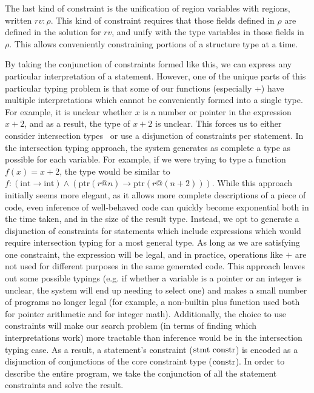 The last kind of constraint is the unification of region variables with regions, written $rv : \rho$. This kind of constraint requires that those fields defined in $\rho$ are defined in the solution for $rv$, and unify with the type variables in those fields in $\rho$. This allows conveniently constraining portions of a structure type at a time.

By taking the conjunction of constraints formed like this, we can express any particular interpretation of a statement.
However, one of the unique parts of this particular typing problem is that some of our functions (especially +) have multiple interpretations which cannot be conveniently formed into a single type. For example, it is unclear whether $x$ is a number or pointer in the expression $x + 2$, and as a result, the type of $x + 2$ is unclear.
This forces us to either consider intersection types~\cite{Jim1995,Shao1993} or use a disjunction of constraints per statement. In the intersection typing approach, the system generates as complete a type as possible for each variable. For example, if we were trying to type a function $f(x) = x + 2$, the type would be similar to $f : (\mathrm{int} \rightarrow \mathrm{int}) \wedge (\mathrm{ptr}(r@n) \rightarrow \mathrm{ptr}(r@(n+2)))$. While this approach initially seems more elegant, as it allows more complete descriptions of a piece of code, even inference of well-behaved code can quickly become exponential both in the time taken, and in the size of the result type. Instead, we opt to generate a disjunction of constraints for statements which include expressions which would require intersection typing for a most general type. As long as we are satisfying one constraint, the expression will be legal, and in practice, operations like $+$ are not used for different purposes in the same generated code. This approach leaves out some possible typings (e.g. if whether a variable is a pointer or an integer is unclear, the system will end up needing to select one) and makes a small number of programs no longer legal (for example, a non-builtin plus function used both for pointer arithmetic and for integer math). Additionally, the choice to use constraints will make our search problem (in terms of finding which interpretations work) more tractable than inference would be in the intersection typing case. As a result, a statement's constraint ($\textrm{stmt constr}$) is encoded as a disjunction of conjunctions of the core constraint type ($\textrm{constr}$). In order to describe the entire program, we take the conjunction of all the statement constraints and solve the result.

